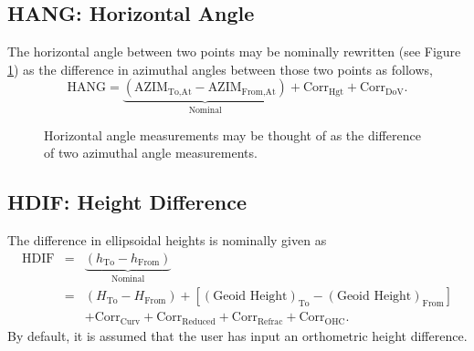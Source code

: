 \subsection{HANG: Horizontal Angle}
The horizontal angle between two points may be nominally rewritten (see Figure \ref{Fig:HANG}) as the difference in azimuthal angles between those two points as follows,
\begin{equation}
\text{HANG}=\underbrace{\left(\text{AZIM}_{\text{To,At}}-\text{AZIM}_{\text{From,At}}\right)}_{\text{Nominal}}+\text{Corr}_{\text{Hgt}}+\text{Corr}_{\text{DoV}}.
\end{equation}
\begin{figure}[!htbp]
\centering
{}
\caption{Horizontal angle measurements may be thought of as the difference of two azimuthal angle measurements.}
\label{Fig:HANG}
\end{figure}
\subsection{HDIF: Height Difference} \label{subsection:HDIF}
The difference in ellipsoidal heights is nominally given as
\begin{eqnarray*}
\text{HDIF} &=& \underbrace{\left(h_{\text{To}}-h_{\text{From}}\right)}_{\text{Nominal}}\\
&=&\left(H_{\text{To}}-H_{\text{From}}\right)+\left[\left(\text{Geoid Height}\right)_{\text{To}}-\left(\text{Geoid Height}\right)_{\text{From}}\right]\\
&& + \text{Corr}_{\text{Curv}} + \text{Corr}_{\text{Reduced}} + \text{Corr}_{\text{Refrac}} + \text{Corr}_{\text{OHC}}.
\end{eqnarray*}
By default, it is assumed that the user has input an orthometric height difference.
